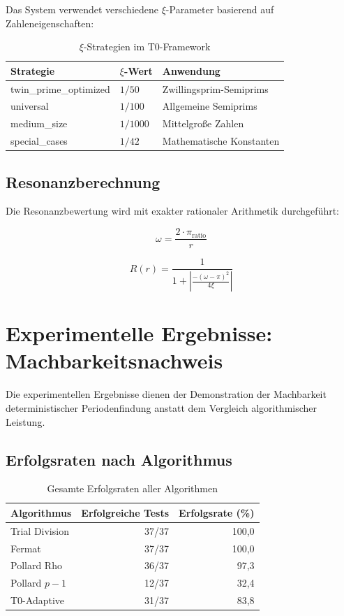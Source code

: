 	Das System verwendet verschiedene $\xi$-Parameter basierend auf Zahleneigenschaften:
	
	\begin{table}[H]
		\centering
		\caption{$\xi$-Strategien im T0-Framework}
		\begin{tabular}{lll}
			\toprule
			\textbf{Strategie} & \textbf{$\xi$-Wert} & \textbf{Anwendung} \\
			\midrule
			twin\_prime\_optimized & $1/50$ & Zwillingsprim-Semiprims \\
			universal & $1/100$ & Allgemeine Semiprims \\
			medium\_size & $1/1000$ & Mittelgroße Zahlen \\
			special\_cases & $1/42$ & Mathematische Konstanten \\
			\bottomrule
		\end{tabular}
		\label{tab:xi_strategies}
	\end{table}
	
	\subsection{Resonanzberechnung}
	
	Die Resonanzbewertung wird mit exakter rationaler Arithmetik durchgeführt:
	
	\begin{equation}
		\omega = \frac{2 \cdot \pi_{\text{ratio}}}{r}
	\end{equation}
	
	\begin{equation}
		R(r) = \frac{1}{1 + \left|\frac{-(\omega-\pi)^2}{4\xi}\right|}
	\end{equation}
	
	\section{Experimentelle Ergebnisse: Machbarkeitsnachweis}
	
	Die experimentellen Ergebnisse dienen der Demonstration der Machbarkeit deterministischer Periodenfindung anstatt dem Vergleich algorithmischer Leistung.
	
	\subsection{Erfolgsraten nach Algorithmus}
	
	\begin{table}[H]
		\centering
		\caption{Gesamte Erfolgsraten aller Algorithmen}
		\begin{tabular}{lrr}
			\toprule
			\textbf{Algorithmus} & \textbf{Erfolgreiche Tests} & \textbf{Erfolgsrate (\%)} \\
			\midrule
			Trial Division & 37/37 & 100,0 \\
			Fermat & 37/37 & 100,0 \\
			Pollard Rho & 36/37 & 97,3 \\
			Pollard $p-1$ & 12/37 & 32,4 \\
			T0-Adaptive & 31/37 & 83,8 \\
			\bottomrule
		\end{tabular}
		\label{tab:success_rates}
	\end{table}
	
